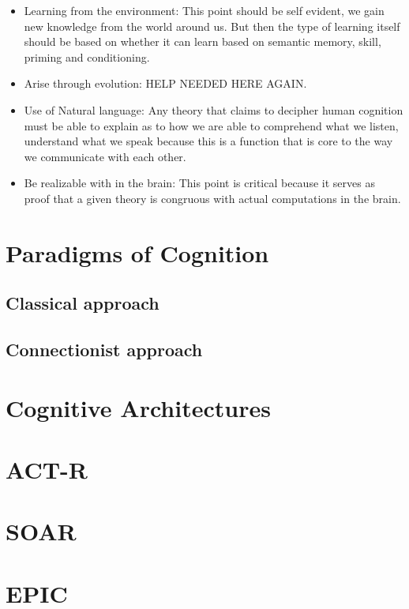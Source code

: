 \begin{itemize}
\item Learning from the environment: This point should be self
evident, we gain new knowledge from the world around us. But then
the type of learning itself should be based on whether it can learn based on
semantic memory, skill, priming and conditioning.

\item Arise through evolution: HELP NEEDED HERE AGAIN.

\item Use of Natural language: Any theory that claims to decipher human
cognition must be able to explain as to how we are able to comprehend
what we listen, understand what we speak because this is a function
that is core to the way we communicate with each other.

\item Be realizable with in the brain: This point is critical because
it serves as proof that a given theory is congruous with actual
computations in the brain.
\end{itemize}
\section{Paradigms of Cognition}
\subsection{Classical approach}
\subsection{Connectionist approach}
\section{Cognitive Architectures}
\section{ACT-R}
\section{SOAR}
\section{EPIC}
